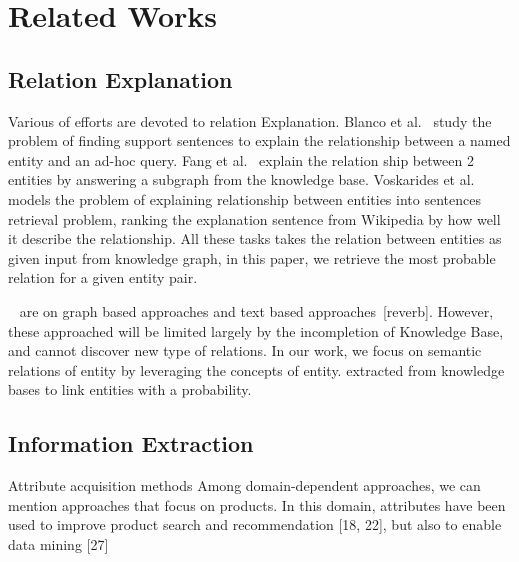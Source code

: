 \section{Related Works}





\subsection{Relation Explanation}


Various of efforts are devoted to relation Explanation.
Blanco et al.~\cite{blanco2010finding} study the problem of finding support sentences to explain the relationship between a named entity and an ad-hoc query.
Fang et al.~\cite{fang2011rex} explain the relation ship between 2 entities by answering a subgraph from the knowledge base.
Voskarides et al.~\cite{voskarideslearning} models the problem of explaining relationship between entities into sentences retrieval problem, ranking the explanation sentence from Wikipedia by how well it describe the relationship.
All these tasks takes the relation between entities as given input from knowledge graph, in this paper, we retrieve the most probable relation for a given entity pair.

~\cite{shahaf2010connecting,luo2007answering} are on graph based approaches and text based approaches~\cite{hasegawa2004discovering}[reverb].
However, these approached will be limited largely by the incompletion of Knowledge Base, and cannot discover new type of relations.
In our work, we focus on semantic relations of entity by leveraging the concepts of entity. extracted from knowledge bases to link entities with a probability.


\subsection{Information Extraction}

Attribute acquisition methods
Among domain-dependent approaches, we can mention approaches that focus on products. In this domain, attributes have been used to improve product search and recommendation [18, 22], but also to enable data mining [27]

